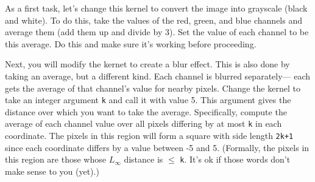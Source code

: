 \documentclass{article}
\begin{document}
As a first task, let's change this kernel to convert the image into 
grayscale (black and white).
To do this, take the values of the red, green, and blue channels and
average them (add them up and divide by 3).
Set the value of each channel to be this average.
Do this and make sure it's working before proceeding.

Next, you will modify the kernet to create a blur effect.
This is also done by taking an average, but a different kind.
Each channel is blurred separately--- each gets the average of that
channel's value for nearby pixels.
Change the kernel to take an integer argument {\tt k} and 
call it with value 5.
This argument gives the distance over which you want to take the
average.
Specifically, compute the average of each channel value over all
pixels differing by at most {\tt k} in each coordinate.
The pixels in this region will form a square with side length
{\tt 2k+1} since each coordinate differs by a value between -5 and 5.
(Formally, the pixels in this region are those whose $L_\infty$
 distance is $\leq$ {\tt k}.
 It's ok if those words don't make sense to you (yet).)
\end{document}
